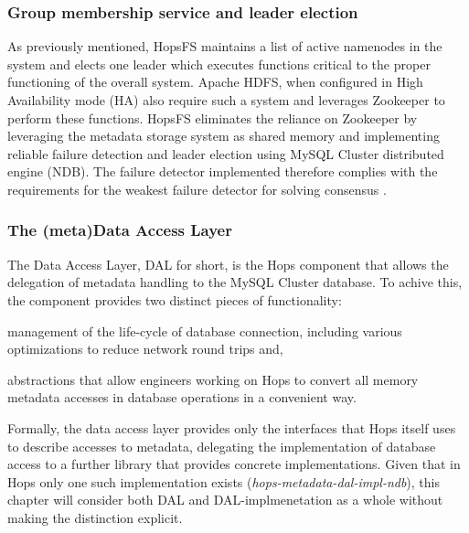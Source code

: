 \subsubsection{Group membership service and leader election}
\label{sec:leader-election}
As previously mentioned, HopsFS maintains a list of active namenodes in the system and elects one leader which executes functions critical to the proper functioning of the overall system.
Apache HDFS, when configured in High Availability mode (HA) also require such a system and leverages Zookeeper to perform these functions.
HopsFS eliminates the reliance on Zookeeper by leveraging the metadata storage system as shared memory and implementing reliable failure detection and leader election \cite{DBLP:conf/dais/NiaziIBD15} using MySQL Cluster distributed engine (NDB).
The failure detector implemented therefore complies with the requirements for the weakest failure detector for solving consensus  \cite{DBLP:journals/jacm/ChandraHT96}.

\subsubsection{The (meta)Data Access Layer}
\label{sec:dal}
The Data Access Layer, DAL for short, is the Hops component that allows the delegation of metadata handling to the MySQL Cluster database.
To achive this, the component provides two distinct pieces of functionality:
\begin{inparaenum}[i)]
    \item management of the life-cycle of database connection, including various optimizations to reduce network round trips and,
    \item abstractions that allow engineers working on Hops to convert all memory metadata accesses in database operations in a convenient way.
\end{inparaenum}
Formally, the data access layer provides only the interfaces that Hops itself uses to describe accesses to metadata, delegating the implementation of database access to a further library that provides concrete implementations.
Given that in Hops only one such implementation exists (\textit{hops-metadata-dal-impl-ndb}), this chapter will consider both DAL and DAL-implmenetation as a whole without making the distinction explicit.

